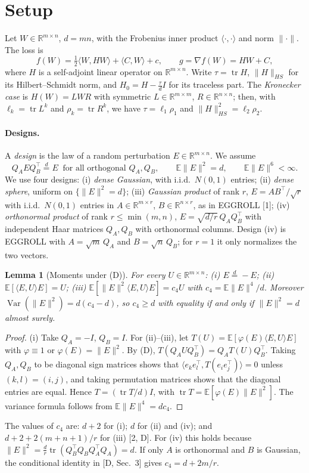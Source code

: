 \documentclass[11pt]{article}
\newtheorem{lemma}[theorem]{Lemma}
\theoremstyle{remark}
\newcommand{\R}{\mathbb{R}}
\newcommand{\E}{\mathbb{E}}
\newcommand{\ip}[2]{\langle #1,#2\rangle}
\DeclareMathOperator{\tr}{tr}
\DeclareMathOperator{\Var}{Var}
\begin{document}
\section{Setup}
Let $W\in\R^{m\times n}$, $d=mn$, with the Frobenius inner product $\ip{\cdot}{\cdot}$ and norm $\|\cdot\|$. The loss is
\[
f(W)=\tfrac12\ip{W}{HW}+\ip{C}{W}+c,\qquad g=\nabla f(W)=HW+C,
\]
where $H$ is a self-adjoint linear operator on $\R^{m\times n}$. Write $\tau=\tr H$, $\|H\|_{HS}$ for its Hilbert--Schmidt norm, and $H_0=H-\frac{\tau}{d}I$ for its traceless part. The \emph{Kronecker case} is $H(W)=LWR$ with symmetric $L\in\R^{m\times m}$, $R\in\R^{n\times n}$; then, with $\ell_k=\tr L^k$ and $\rho_k=\tr R^k$, we have $\tau=\ell_1\rho_1$ and $\|H\|_{HS}^2=\ell_2\rho_2$.

\paragraph{Designs.} A \emph{design} is the law of a random perturbation $E\in\R^{m\times n}$. We assume
\begin{equation}\tag{D}
Q_AEQ_B^\top\overset{d}{=}E\ \text{ for all orthogonal }Q_A,Q_B,\qquad \E\|E\|^2=d,\qquad \E\|E\|^6<\infty .
\end{equation}
We use four designs: (i) \emph{dense Gaussian}, with i.i.d.\ $N(0,1)$ entries; (ii) \emph{dense sphere}, uniform on $\{\|E\|^2=d\}$; (iii) \emph{Gaussian product} of rank $r$, $E=AB^\top/\sqrt r$ with i.i.d.\ $N(0,1)$ entries in $A\in\R^{m\times r}$, $B\in\R^{n\times r}$, as in EGGROLL [1]; (iv) \emph{orthonormal product} of rank $r\le\min(m,n)$, $E=\sqrt{d/r}\,Q_AQ_B^\top$ with independent Haar matrices $Q_A,Q_B$ with orthonormal columns. Design (iv) is EGGROLL with $A=\sqrt m\,Q_A$ and $B=\sqrt n\,Q_B$; for $r=1$ it only normalizes the two vectors.

\begin{lemma}[Moments under (D)]\label{lem:moments}
For every $U\in\R^{m\times n}$: (i) $E\overset{d}{=}-E$; (ii) $\E[\ip{E}{U}E]=U$; (iii) $\E[\|E\|^2\ip{E}{U}E]=c_4U$ with $c_4=\E\|E\|^4/d$. Moreover $\Var(\|E\|^2)=d(c_4-d)$, so $c_4\ge d$ with equality if and only if $\|E\|^2=d$ almost surely.
\end{lemma}
\begin{proof}
(i) Take $Q_A=-I$, $Q_B=I$. For (ii)--(iii), let $T(U)=\E[\varphi(E)\ip{E}{U}E]$ with $\varphi\equiv1$ or $\varphi(E)=\|E\|^2$. By (D), $T(Q_AUQ_B^\top)=Q_AT(U)Q_B^\top$. Taking $Q_A,Q_B$ to be diagonal sign matrices shows that $\ip{e_ke_l^\top}{T(e_ie_j^\top)}=0$ unless $(k,l)=(i,j)$, and taking permutation matrices shows that the diagonal entries are equal. Hence $T=(\tr T/d)I$, with $\tr T=\E[\varphi(E)\|E\|^2]$. The variance formula follows from $\E\|E\|^4=dc_4$.
\end{proof}
The values of $c_4$ are: $d+2$ for (i); $d$ for (ii) and (iv); and $d+2+2(m+n+1)/r$ for (iii) [2, D]. For (iv) this holds because $\|E\|^2=\frac dr\tr(Q_B^\top Q_BQ_A^\top Q_A)=d$. If only $A$ is orthonormal and $B$ is Gaussian, the conditional identity in [D, Sec.~3] gives $c_4=d+2m/r$.
\end{document}
